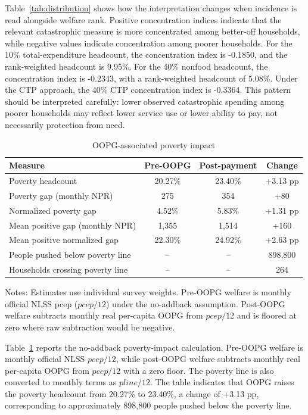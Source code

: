 \documentclass[11pt]{article}
\begin{document}
Table~\ref{tab:distribution} shows how the interpretation changes when incidence is read alongside welfare rank. Positive concentration indices indicate that the relevant catastrophic measure is more concentrated among better-off households, while negative values indicate concentration among poorer households. For the 10\% total-expenditure headcount, the concentration index is -0.1850, and the rank-weighted headcount is 9.95\%. For the 40\% nonfood headcount, the concentration index is -0.2343, with a rank-weighted headcount of 5.08\%. Under the CTP approach, the 40\% CTP concentration index is -0.3364. This pattern should be interpreted carefully: lower observed catastrophic spending among poorer households may reflect lower service use or lower ability to pay, not necessarily protection from need.

\begin{table}[!htbp]
\centering
\begin{threeparttable}
\caption{OOPG-associated poverty impact}
\label{tab:poverty}
\small
\begin{tabular}{lccc}
\toprule
Measure & Pre-OOPG & Post-payment & Change \\
\midrule
Poverty headcount & 20.27\% & 23.40\% & +3.13 pp \\
Poverty gap (monthly NPR) & 275 & 354 & +80 \\
Normalized poverty gap & 4.52\% & 5.83\% & +1.31 pp \\
Mean positive gap (monthly NPR) & 1,355 & 1,514 & +160 \\
Mean positive normalized gap & 22.30\% & 24.92\% & +2.63 pp \\
\addlinespace
People pushed below poverty line & -- & -- & 898,800 \\
Households crossing poverty line & -- & -- & 264 \\
\bottomrule
\end{tabular}
\begin{tablenotes}
\small
\item Notes: Estimates use individual survey weights. Pre-OOPG welfare is monthly official NLSS pcep ($pcep/12$) under the no-addback assumption. Post-OOPG welfare subtracts monthly real per-capita OOPG from $pcep/12$ and is floored at zero where raw subtraction would be negative.
\end{tablenotes}
\end{threeparttable}
\end{table}

Table~\ref{tab:poverty} reports the no-addback poverty-impact calculation. Pre-OOPG welfare is monthly official NLSS $pcep/12$, while post-OOPG welfare subtracts monthly real per-capita OOPG from $pcep/12$ with a zero floor. The poverty line is also converted to monthly terms as $pline/12$. The table indicates that OOPG raises the poverty headcount from 20.27\% to 23.40\%, a change of +3.13 pp, corresponding to approximately 898,800 people pushed below the poverty line.
\end{document}
